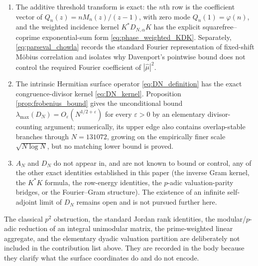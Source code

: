 \documentclass[11pt]{amsart}
\numberwithin{equation}{section}
\theoremstyle{plain}
\theoremstyle{definition}
\theoremstyle{remark}
\newcommand{\eps}{\varepsilon}
\newcommand{\mob}{\mu}
\begin{document}
\begin{enumerate}[label=(\roman*)]
\item The additive threshold transform is exact: the $n$th row is the coefficient vector of $Q_n(z)=nM_n(z)/(z-1)$, with zero mode $Q_n(1)=\varphi(n)$, and the weighted incidence kernel $K^*D_{N,\alpha}K$ has the explicit squarefree--coprime exponential-sum form \eqref{eq:phase_weighted_KDK}.  Separately, \eqref{eq:parseval_chowla} records the standard Fourier representation of fixed-shift Möbius correlation and isolates why Davenport's pointwise bound does not control the required Fourier coefficient of $|\widehat\mob|^2$.

\item The intrinsic Hermitian surface operator \eqref{eq:DN_definition} has the exact congruence-divisor kernel \eqref{eq:DN_kernel}.  Proposition \ref{prop:frobenius_bound} gives the unconditional bound $\lambda_{\max}(D_N)=O_\eps(N^{1/2+\eps})$ for every $\eps>0$ by an elementary divisor-counting argument; numerically, its upper edge also contains overlap-stable branches through $N=131072$, growing on the empirically finer scale $\sqrt{N\log N}$, but no matching lower bound is proved.

\item $A_N$ and $D_N$ do not appear in, and are not known to bound or control, any of the other exact identities established in this paper (the inverse Gram kernel, the $K^*K$ formula, the row-energy identities, the $p$-adic valuation-parity bridges, or the Fourier--Gram structure).  The existence of an infinite self-adjoint limit of $D_N$ remains open and is not pursued further here.

\end{enumerate}

The classical $p^2$ obstruction, the standard Jordan rank identities, the modular/$p$-adic reduction of an integral unimodular matrix, the prime-weighted linear aggregate, and the elementary dyadic valuation partition are deliberately not included in the contribution list above.  They are recorded in the body because they clarify what the surface coordinates do and do not encode.
\end{document}
